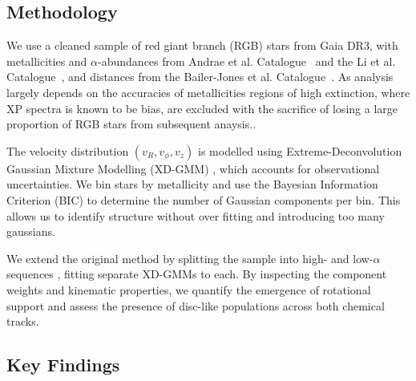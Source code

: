 \documentclass[a4paper,10pt]{article}
\begin{document}
\begin{multicols}{2}
\subsection*{Methodology}

We use a cleaned sample of red giant branch (RGB) stars from Gaia DR3, with metallicities and $\alpha$-abundances from Andrae et 
al. Catalogue~\cite{Andrae2023} and the Li et al. Catalogue~\cite{Li2024}, and distances from the Bailer-Jones et al. 
Catalogue~\cite{BailerJones2021}. As analysis largely depends on the accuracies of metallicities regions of high extinction, 
where XP spectra is known to be bias, are excluded with the sacrifice of losing a large proportion of RGB stars from subsequent anaysis..

The velocity distribution $(v_R, v_\phi, v_z)$ is modelled using Extreme-Deconvolution Gaussian Mixture Modelling (XD-GMM) \cite{Bovy2011}\cite{pygmmis}, 
which accounts for observational uncertainties. We bin stars by metallicity and use the Bayesian Information Criterion (BIC) to determine the 
number of Gaussian components per bin. This allows us to identify structure without over fitting and introducing too many gaussians.

We extend the original method by splitting the sample into high- and low-$\alpha$ sequences \citep{Vis2024}, fitting separate 
XD-GMMs to each. By inspecting the component weights and kinematic properties, we quantify the emergence of rotational support 
and assess the presence of disc-like populations across both chemical tracks.

\subsection*{Key Findings}





\end{multicols}
\end{document}
